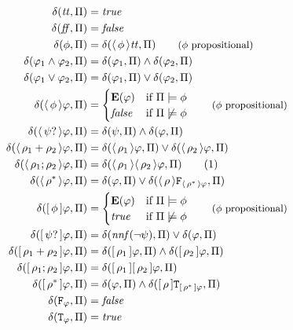 \begin{align*}
	\delta(\ltt, \Pi) &= \true \\
	\delta(\lff, \Pi) &= \false \\
	\delta(\propformula, \Pi) &= \delta(\ldiamond{\propformula}\ltt, \Pi) 
		\qquad \text{\small ($\propformula$ propositional)} \\
	\delta(\formula_1 \land \formula_2, \Pi) &=
		\delta(\formula_1, \Pi) \land \delta(\formula_2, \Pi) \\
	\delta(\formula_1 \lor \formula_2, \Pi) &=
		\delta(\formula_1, \Pi) \lor \delta(\formula_2, \Pi) \\
	\delta(\ldiamond{\propformula}\formula, \Pi) &=
		\begin{cases}
			\mathbf{E}(\formula) & \text{if $\Pi \models \propformula$} \\
			\false & \text{if $\Pi \not\models \propformula$}
		\end{cases}
		\qquad \text{\small $(\propformula$ propositional)} \\
	\delta(\ldiamond{\psi?}\formula, \Pi) &=
		\delta(\psi, \Pi) \land \delta(\formula, \Pi) \\
	\delta(\ldiamond{\resym_1 + \resym_2}\formula, \Pi) &=
		\delta(\ldiamond{\resym_1}\formula, \Pi) \lor
		\delta(\ldiamond{\resym_2}\formula, \Pi) \\
	\delta(\ldiamond{\resym_1 ; \resym_2}\formula, \Pi) &=
		\delta(\ldiamond{\resym_1}\ldiamond{\resym_2}\formula, \Pi)
		\stepcounter{equation}\label{eq:ldlf-delta}\tag{\theequation} \\
	\delta(\ldiamond{\resym^*}\formula, \Pi) &=
		\delta(\formula, \Pi) \lor
		\delta(\ldiamond{\resym}\mathtt{F}_{\ldiamond{\resym^*}\formula}, \Pi)
		\\
	\delta(\lbox{\propformula}\formula, \Pi) &=
		\begin{cases}
			\mathbf{E}(\formula) & \text{if $\Pi \models \propformula$} \\
			\true & \text{if $\Pi \not\models \propformula$}
		\end{cases}
		\qquad \text{\small $(\propformula$ propositional)} \\
	\delta(\lbox{\psi?}\formula, \Pi) &=
		\delta(\const{nnf}(\lnot\psi), \Pi) \lor \delta(\formula, \Pi) \\
	\delta(\lbox{\resym_1 + \resym_2}\formula, \Pi) &=
		\delta(\lbox{\resym_1}\formula, \Pi) \land
		\delta(\lbox{\resym_2}\formula, \Pi) \\
	\delta(\lbox{\resym_1 ; \resym_2}\formula, \Pi) &=
		\delta(\lbox{\resym_1}\lbox{\resym_2}\formula, \Pi) \\
	\delta(\lbox{\resym^*}\formula, \Pi) &=
		\delta(\formula, \Pi) \land
		\delta(\lbox{\resym}\mathtt{T}_{\lbox{\resym^*}\formula}, \Pi) \\
	\delta(\mathtt{F}_\formula, \Pi) &= \false \\
	\delta(\mathtt{T}_\formula, \Pi) &= \true
\end{align*}
